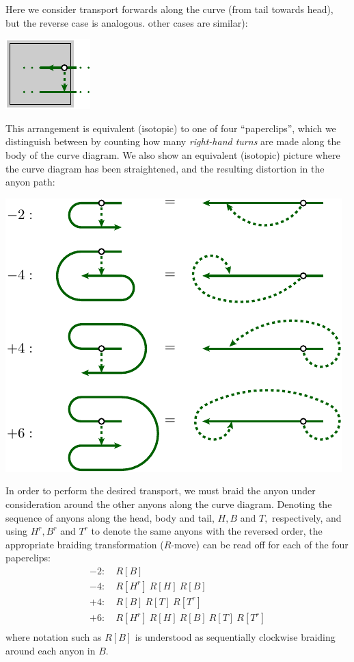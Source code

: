 \documentclass[aps, letterpaper, onecolumn, superscriptaddress, notitlepage, 10pt]{revtex4-1}
\begin{document}
Here we consider transport forwards along the curve (from tail towards head), but the reverse case is analogous.
other cases are similar):
\begin{center}
\includegraphics[]{pic-move-anyon.pdf}
\end{center}

This arrangement is equivalent (isotopic) to one of four 
``paperclips'', which we distinguish between by counting how
many \emph{right-hand turns} are made along the body of the curve diagram.
We also show an equivalent (isotopic) picture where the
curve diagram has been straightened, and the resulting distortion
in the anyon path:
\begin{center}
\includegraphics[]{pic-paperclip.pdf}
\end{center}
In order to perform the desired transport, we must braid the anyon under consideration around the other anyons along the curve diagram. Denoting the sequence of anyons along the head, body and tail, $H, B$ and $T,$
respectively, and using
$H^r, B^r$ and $T^r$ to denote the same anyons with the reversed order, the appropriate braiding transformation ($R$-move) can be read off for each
of the four paperclips:
\begin{align*}
-2:&\ R[B] \\
-4:&\ R[H^r]\ R[H]\ R[B] \\
+4:&\ R[B]\ R[T]\ R[T^r] \\
+6:&\ R[H^r]\ R[H]\ R[B]\ R[T]\ R[T^r] \\
\end{align*}
where notation such as $R[B]$ is understood as sequentially clockwise braiding around
each anyon in $B$. 
\end{document}

